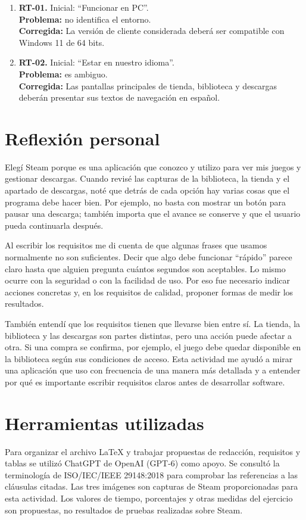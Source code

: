 \documentclass[12pt,a4paper]{article}
\begin{document}
\begin{enumerate}[leftmargin=*,itemsep=8pt]
\item \textbf{RT-01.} Inicial: ``Funcionar en PC''. \\\textbf{Problema:} no identifica el entorno. \\\textbf{Corregida:} La versión de cliente considerada deberá ser compatible con Windows 11 de 64 bits.
\item \textbf{RT-02.} Inicial: ``Estar en nuestro idioma''. \\\textbf{Problema:} es ambiguo. \\\textbf{Corregida:} Las pantallas principales de tienda, biblioteca y descargas deberán presentar sus textos de navegación en español.
\end{enumerate}

\section{Reflexión personal}

Elegí Steam porque es una aplicación que conozco y utilizo para ver mis juegos y gestionar descargas. Cuando revisé las capturas de la biblioteca, la tienda y el apartado de descargas, noté que detrás de cada opción hay varias cosas que el programa debe hacer bien. Por ejemplo, no basta con mostrar un botón para pausar una descarga; también importa que el avance se conserve y que el usuario pueda continuarla después.

Al escribir los requisitos me di cuenta de que algunas frases que usamos normalmente no son suficientes. Decir que algo debe funcionar ``rápido'' parece claro hasta que alguien pregunta cuántos segundos son aceptables. Lo mismo ocurre con la seguridad o con la facilidad de uso. Por eso fue necesario indicar acciones concretas y, en los requisitos de calidad, proponer formas de medir los resultados.

También entendí que los requisitos tienen que llevarse bien entre sí. La tienda, la biblioteca y las descargas son partes distintas, pero una acción puede afectar a otra. Si una compra se confirma, por ejemplo, el juego debe quedar disponible en la biblioteca según sus condiciones de acceso. Esta actividad me ayudó a mirar una aplicación que uso con frecuencia de una manera más detallada y a entender por qué es importante escribir requisitos claros antes de desarrollar software.

\section{Herramientas utilizadas}

Para organizar el archivo LaTeX y trabajar propuestas de redacción, requisitos y tablas se utilizó ChatGPT de OpenAI (GPT-6) como apoyo. Se consultó la terminología de ISO/IEC/IEEE 29148:2018 para comprobar las referencias a las cláusulas citadas. Las tres imágenes son capturas de Steam proporcionadas para esta actividad. Los valores de tiempo, porcentajes y otras medidas del ejercicio son propuestas, no resultados de pruebas realizadas sobre Steam.

\printbibliography[heading=bibintoc,title={Referencias bibliográficas}]
\end{document}

